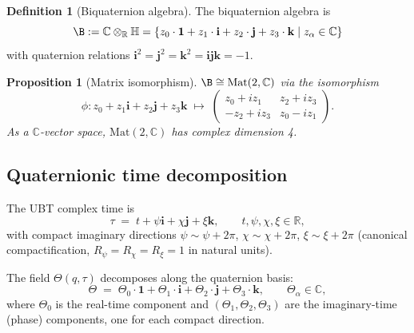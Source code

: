 \documentclass[12pt,a4paper]{article}
\newtheorem{proposition}[theorem]{Proposition}
\theoremstyle{definition}
\newtheorem{definition}[theorem]{Definition}
\theoremstyle{remark}
\newcommand{\C}{\mathbb{C}}
\newcommand{\R}{\mathbb{R}}
\renewcommand{\H}{\mathbb{H}}
\begin{document}
\begin{definition}[Biquaternion algebra]
The biquaternion algebra is
\begin{equation}
  \B := \C \otimes_{\R} \H
  = \{z_0 \cdot \mathbf{1} + z_1 \cdot \mathbf{i} + z_2 \cdot \mathbf{j} + z_3 \cdot \mathbf{k}
    \mid z_\alpha \in \C\}
  \label{eq:biquat_def}
\end{equation}
with quaternion relations $\mathbf{i}^2 = \mathbf{j}^2 = \mathbf{k}^2 = \mathbf{ijk} = -1$.
\end{definition}

\begin{proposition}[Matrix isomorphism]
$\B \cong \mathrm{Mat}(2,\C)$ via the isomorphism
\begin{equation}
  \phi: z_0 + z_1\mathbf{i} + z_2\mathbf{j} + z_3\mathbf{k}
  \;\longmapsto\;
  \begin{pmatrix} z_0 + iz_1 & z_2 + iz_3 \\ -z_2 + iz_3 & z_0 - iz_1 \end{pmatrix}.
  \label{eq:mat2C}
\end{equation}
As a $\C$-vector space, $\mathrm{Mat}(2,\C)$ has complex dimension 4.
\end{proposition}

\subsection{Quaternionic time decomposition}

The UBT complex time is
\begin{equation}
  \tau \;=\; t + \psi\mathbf{i} + \chi\mathbf{j} + \xi\mathbf{k},
  \qquad t,\psi,\chi,\xi \in \R,
  \label{eq:quat_time}
\end{equation}
with compact imaginary directions $\psi \sim \psi+2\pi$, $\chi \sim \chi+2\pi$,
$\xi \sim \xi+2\pi$ (canonical compactification, $R_\psi = R_\chi = R_\xi = 1$
in natural units).

The field $\Theta(q,\tau)$ decomposes along the quaternion basis:
\begin{equation}
  \Theta \;=\; \Theta_0 \cdot \mathbf{1}
             + \Theta_1 \cdot \mathbf{i}
             + \Theta_2 \cdot \mathbf{j}
             + \Theta_3 \cdot \mathbf{k},
  \qquad \Theta_\alpha \in \C,
  \label{eq:quat_decomp}
\end{equation}
where $\Theta_0$ is the real-time component and $(\Theta_1, \Theta_2, \Theta_3)$
are the imaginary-time (phase) components, one for each compact direction.
\end{document}

